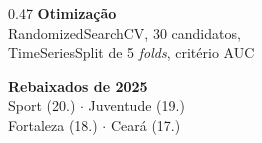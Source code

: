 \documentclass[aspectratio=169,11pt,t]{beamer}
\begin{document}
{\begin{frame}[plain]
\begin{columns}[t]
\begin{column}{0.47\textwidth}
            \vspace{0.3cm}
            \textbf{Otimização}\\
            RandomizedSearchCV, 30 candidatos,\\
            TimeSeriesSplit de 5 \emph{folds}, critério AUC

            \vspace{0.3cm}
            \textbf{Rebaixados de 2025}\\
            Sport (20.\textordmasculine{}) $\cdot$ Juventude (19.\textordmasculine{})\\
            Fortaleza (18.\textordmasculine{}) $\cdot$ Ceará (17.\textordmasculine{})
        \end{column}
    \end{columns}
\end{frame}
}
\end{document}
